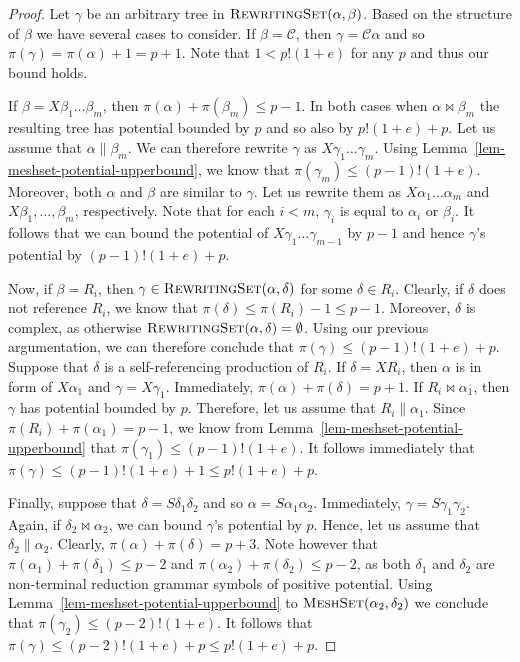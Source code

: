 \documentclass[11pt,a4paper]{amsart}
\theoremstyle{definition}
\newcommand{\RewritingSet}[2]{\textsc{RewritingSet}(#1,#2)}
\newcommand{\MeshSet}[2]{\textsc{MeshSet}(#1,#2)}
\newcommand{\potential}[1]{\pi(#1)}
\begin{document}
\begin{proof}
    Let $\gamma$ be an arbitrary tree in $\RewritingSet{\alpha}{\beta}$. Based
    on the structure of $\beta$ we have several cases to consider.    
    If $\beta = \mathcal{C}$, then $\gamma = \mathcal{C} \alpha$ and so
     $\potential{\gamma} = \potential{\alpha} + 1 = p + 1$. Note
    that $1 < p! (1 + e)$ for any $p$ and thus our bound holds. 
    
    If $\beta = X
    \beta_1 \ldots \beta_m$, then $\potential{\alpha} + \potential{\beta_m} \leq p - 1$. 	In both cases when 	$\alpha \bowtie \beta_m$ the resulting tree has potential bounded
     by $p$ and so also by $p! (1 + e) + p$. Let us assume that $\alpha \parallel
      \beta_m$. We can therefore rewrite $\gamma$ as $X \gamma_1 \ldots \gamma_m$.
    Using Lemma~\ref{lem-meshset-potential-upperbound}, we know that
    $\potential{\gamma_m} \leq (p-1)! (1 + e)$. Moreover, both $\alpha$ and $\beta$
     are similar to $\gamma$. Let us rewrite them as $X \alpha_1 \ldots \alpha_m$ and $X \beta_1, \ldots, \beta_m$, respectively. Note that for each  $i < m$, $\gamma_i$ is  equal to $\alpha_i$ or $\beta_i$. It follows that we can bound the potential of $X \gamma_1 \ldots \gamma_{m-1}$ by $p-1$ and hence $\gamma$'s potential by $(p-1)! (1 + e) + p$.

    Now, if $\beta = R_i$, then $\gamma \in \RewritingSet{\alpha}{\delta}$
    for some $\delta \in R_i$. Clearly, if $\delta$ does not reference $R_i$, we know that $\potential{\delta} \leq \potential{R_i} - 1 \leq p - 1$. Moreover, $\delta$ is complex, as otherwise $\RewritingSet{\alpha}{\delta} = \emptyset$. Using our previous argumentation, we can therefore conclude that $\potential{\gamma} \leq (p-1)! (1 + e) + p$.
    Suppose that $\delta$ is a self-referencing production of $R_i$. If $\delta = X R_i$, then $\alpha$ is in form of $X \alpha_1$ and $\gamma = X \gamma_1$. Immediately,
    $\potential{\alpha} + \potential{\delta} = p + 1$. If $R_i \bowtie \alpha_1$, then $\gamma$ has potential bounded by $p$. Therefore, let us assume
    that $R_i \parallel \alpha_1$. Since $\potential{R_i} + \potential{\alpha_1} = p - 1$, we know from Lemma~\ref{lem-meshset-potential-upperbound} that $\potential{\gamma_1} \leq (p-1)! (1 + e)$. It follows immediately that $\potential{\gamma} \leq (p-1)! (1 + e) + 1 \leq p! (1 + e) + p$. 
    
    Finally, suppose that $\delta = S \delta_1 \delta_2$ and so
	$\alpha = S \alpha_1 \alpha_2$. Immediately, $\gamma = S \gamma_1 \gamma_2$.
	 Again, if $\delta_2 \bowtie \alpha_2$,
	 we can bound $\gamma$'s potential by $p$. Hence, let us assume that $\delta_2 \parallel \alpha_2$. Clearly, $\potential{\alpha} + \potential{\delta} = p + 3$.
	 Note however that $\potential{\alpha_1} + \potential{\delta_1} \leq p - 2$
	 and $\potential{\alpha_2} + \potential{\delta_2} \leq p - 2$, as
	 both $\delta_1$ and $\delta_2$ are non-terminal reduction grammar symbols of positive potential. Using Lemma~\ref{lem-meshset-potential-upperbound} to
	 $\MeshSet{\alpha_2}{\delta_2}$ we conclude that $\potential{\gamma_2} \leq (p-2)! (1 + e)$. It follows that $\potential{\gamma} \leq (p-2)! (1 + e) + p \leq p! (1 + e) + p$.
\end{proof}
\end{document}
